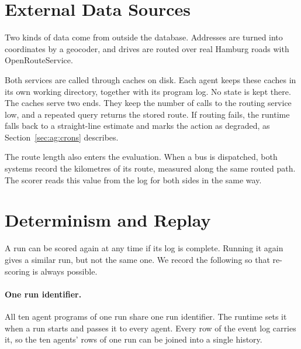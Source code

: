 \section{External Data Sources}
\label{sec:data:external}

Two kinds of data come from outside the database. Addresses are turned into
coordinates by a geocoder, and drives are routed over real Hamburg roads with
OpenRouteService.

Both services are called through caches on disk. Each agent keeps these caches
in its own working directory, together with its program log. No state is kept
there. The caches serve two ends. They keep the number of calls to the routing
service low, and a repeated query returns the stored route. If
routing fails, the runtime falls back to a straight-line estimate and marks
the action as degraded, as Section~\ref{sec:ag:crons} describes.

The route length also enters the evaluation. When a bus is dispatched, both
systems record the kilometres of its route, measured along the same routed
path. The scorer reads this value from the log for both sides in the same way.

\section{Determinism and Replay}
\label{sec:data:replay}

A run can be scored again at any time if its log is complete. Running it
again gives a similar run, but not the same one. We record the following so
that re-scoring is always possible.

\paragraph{One run identifier.} All ten agent programs of one run share one run
identifier. The runtime sets it when a run starts and passes it to every agent.
Every row of the event log carries it, so the ten agents' rows of one run can
be joined into a single history.

